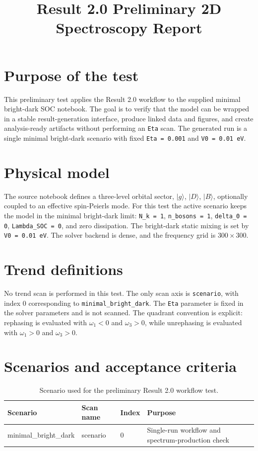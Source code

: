 \documentclass[11pt]{article}
\title{Result 2.0 Preliminary 2D Spectroscopy Report}
\author{}
\date{}
\begin{document}
\maketitle

\section{Purpose of the test}
This preliminary test applies the Result 2.0 workflow to the supplied minimal bright-dark SOC notebook. The goal is to verify that the model can be wrapped in a stable result-generation interface, produce linked data and figures, and create analysis-ready artifacts without performing an \texttt{Eta} scan. The generated run is a single minimal bright-dark scenario with fixed \texttt{Eta = 0.001} and \texttt{V0 = 0.01 eV}.

\section{Physical model}
The source notebook defines a three-level orbital sector, $|g\rangle$, $|D\rangle$, $|B\rangle$, optionally coupled to an effective spin-Peierls mode. For this test the active scenario keeps the model in the minimal bright-dark limit: \texttt{N\_k = 1}, \texttt{n\_bosons = 1}, \texttt{delta\_0 = 0}, \texttt{Lambda\_SOC = 0}, and zero dissipation. The bright-dark static mixing is set by \texttt{V0 = 0.01 eV}. The solver backend is dense, and the frequency grid is $300 \times 300$.

\section{Trend definitions}
No trend scan is performed in this test. The only scan axis is \texttt{scenario}, with index 0 corresponding to \texttt{minimal\_bright\_dark}. The \texttt{Eta} parameter is fixed in the solver parameters and is not scanned. The quadrant convention is explicit: rephasing is evaluated with $\omega_1 < 0$ and $\omega_3 > 0$, while unrephasing is evaluated with $\omega_1 > 0$ and $\omega_3 > 0$.

\section{Scenarios and acceptance criteria}
\begin{table}[h]
\centering
\begin{tabular}{llll}
\toprule
Scenario & Scan name & Index & Purpose \\
\midrule
minimal\_bright\_dark & scenario & 0 & Single-run workflow and spectrum-production check \\
\bottomrule
\end{tabular}
\caption{Scenario used for the preliminary Result 2.0 workflow test.}
\end{table}
\end{document}
